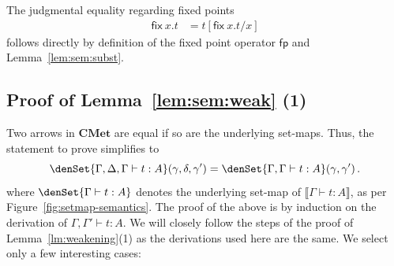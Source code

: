 \documentclass[a4paper,UKenglish,cleveref, autoref, thm-restate]{lipics-v2021}
\newcommand{\cat}[1]{\mathbf{#1}}
\newcommand{\CMet}{\cat{CMet}}
\newcommand{\semfp}{\mathsf{fp}}
\newcommand{\ts}{\vdash}
\newcommand{\hastype}[3]{#1\ts #2 : #3}
\newcommand{\fix}[2]{\mathsf{fix~} #1 . #2 }
\newcommand{\peq}{=}
\newcommand{\den}[1]{\llbracket #1\rrbracket}
\begin{document}
\begin{description}[font=\sc,wide]
    \item[Case fix:] The judgmental equality regarding fixed points
    \begin{align*}
        \fix xt & \peq t[\fix xt/x]
    \end{align*}
    follows directly by definition of the fixed point operator $\semfp$
    and Lemma~\ref{lem:sem:subst}.
    \qedhere
\end{description}

\subsection*{Proof of Lemma~\ref{lem:sem:weak} (1)}
Two arrows in $\CMet$ are equal if so are the underlying set-maps.
Thus, the statement to prove simplifies to 
\begin{equation*}
    \denSet{\hastype{\Gamma,\Delta,\Gamma}tA}(\gamma,\delta,\gamma') = \denSet{\hastype{\Gamma,\Gamma}tA}(\gamma,\gamma') \,.
\end{equation*}
where $\denSet{\hastype{\Gamma}{t}{A}}$ denotes the underlying set-map of $\den{\hastype{\Gamma}{t}{A}}$, as per Figure~\ref{fig:setmap-semantics}.
The proof of the above is by induction on the derivation of $\hastype{\Gamma,\Gamma'}tA$. We will closely follow the steps of the proof of Lemma~\ref{lm:weakening}(1) as the derivations used here are the same. We select only a few interesting cases:
\end{document}
